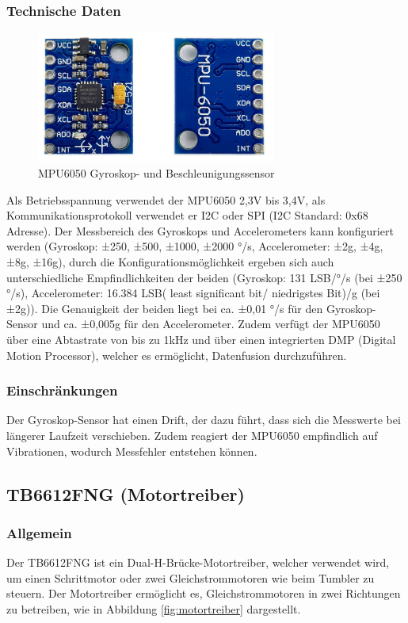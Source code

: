 \subsubsection{Technische Daten}
\begin{figure}[H]
    \centering
    \includegraphics[width=0.7\textwidth]{img/Hardware/MPU6050.png}
    \caption{MPU6050 Gyroskop- und Beschleunigungssensor}
    \label{fig:mpu6050}
\end{figure}
Als Betriebsspannung verwendet der MPU6050 2,3V bis 3,4V,
als Kommunikationsprotokoll verwendet er I2C oder SPI (I2C Standard: 0x68 Adresse).
%
Der Messbereich des Gyroskops und Accelerometers kann konfiguriert werden
(Gyroskop:  ±250, ±500, ±1000, ±2000 °/s, Accelerometer: ±2g, ±4g, ±8g, ±16g),
durch die Konfigurationsmöglichkeit ergeben sich auch unterschiedliche Empfindlichkeiten der beiden
(Gyroskop: 131 LSB/°/s (bei ±250 °/s),
Accelerometer: 16.384 LSB( least significant bit/ niedrigstes Bit)/g (bei ±2g)).
%
Die Genauigkeit der beiden liegt bei ca. ±0,01 °/s für den Gyroskop-Sensor und ca. ±0,005g für den Accelerometer.
%
Zudem verfügt der MPU6050 über eine Abtastrate von bis zu 1kHz und über einen integrierten DMP (Digital Motion Processor),
welcher es ermöglicht, Datenfusion durchzuführen.
%
\subsubsection{Einschränkungen}
Der Gyroskop-Sensor hat einen Drift,
der dazu führt, dass sich die Messwerte bei längerer Laufzeit verschieben.
%
Zudem reagiert der MPU6050 empfindlich auf Vibrationen,
wodurch Messfehler entstehen können.
%
\subsection{TB6612FNG (Motortreiber)}
%
\subsubsection{Allgemein}
Der TB6612FNG ist ein Dual-H-Brücke-Motortreiber,
welcher verwendet wird,
um einen Schrittmotor oder zwei Gleichstrommotoren wie beim Tumbler zu steuern.
%
Der Motortreiber ermöglicht es,
Gleichstrommotoren in zwei Richtungen zu betreiben,
wie in Abbildung \ref{fig:motortreiber} dargestellt.
%
